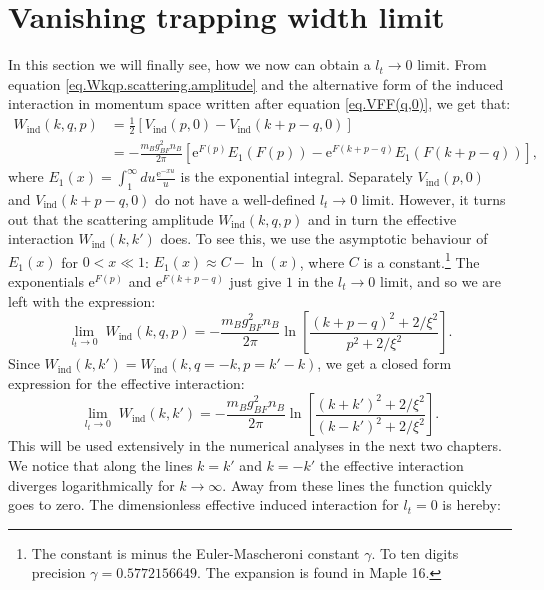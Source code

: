 \section{Vanishing trapping width limit} \label{sec.Vanishingtrappingwidtlimit}
In this section we will finally see, how we now can obtain a $l_t\to 0$ limit. From equation \eqref{eq.Wkqp.scattering.amplitude} and the alternative form of the induced interaction in momentum space written after equation \eqref{eq.VFF(q,0)}, we get that:
\begin{align}
W_{\text{ind}}(k, q, p) &= \frac{1}{2}\left[V_\text{ind}(p, 0) - V_\text{ind}(k + p - q,0)\right] \nonumber \\
&= -\frac{m_Bg_{BF}^2n_B}{2\pi}\left[ \text{e}^{F(p)} E_1(F(p)) - \text{e}^{F(k + p - q)} E_1(F(k + p - q)) \right], \nonumber
\end{align}
where $E_1(x) = \int_1^\infty du \frac{\text{e}^{-xu}}{u}$ is the exponential integral. Separately $V_\text{ind}(p,0)$ and $V_\text{ind}(k + p - q,0)$ do not have a well-defined $l_t \to 0$ limit. However, it turns out that the scattering amplitude $W_{\text{ind}}(k, q, p)$ and in turn the effective interaction $W_{\text{ind}}(k,k')$ does. To see this, we use the asymptotic behaviour of $E_1(x)$ for $0 < x \ll 1$: $E_1(x) \approx C -\ln(x)$, where $C$ is a constant.\footnote{The constant is minus the Euler-Mascheroni constant $\gamma$. To ten digits precision $\gamma = 0.5772156649$. The expansion is found in Maple 16.} The exponentials $\text{e}^{F(p)}$ and $\text{e}^{F(k + p - q)}$ just give $1$ in the $l_t \to 0$ limit, and so we are left with the expression:
\begin{equation}
\lim_{l_t \to 0} \; W_{\text{ind}}(k, q, p) = -\frac{m_Bg_{BF}^2n_B}{2\pi} \ln\left[\frac{(k + p - q)^2+2/\xi^2}{p^2+2/\xi^2}\right].
\label{eq.Wkqp.scattering.amplitude.lt=0} 
\end{equation}
Since $W_{\text{ind}}(k, k') = W_{\text{ind}}(k, q = -k, p = k' - k) $, we get a closed form expression for the effective interaction:
\begin{equation}
\lim_{l_t \to 0} \; W_{\text{ind}}(k, k') = -\frac{m_Bg_{BF}^2n_B}{2\pi} \ln\left[\frac{(k + k')^2+2/\xi^2}{(k - k')^2+2/\xi^2}\right].
\label{eq.EffectiveInteractionlt=0} 
\end{equation}
This will be used extensively in the numerical analyses in the next two chapters. We notice that along the lines $k = k'$ and $k = -k'$ the effective interaction diverges logarithmically for $k\to \infty$. Away from these lines the function quickly goes to zero. The dimensionless effective induced interaction for $l_t = 0$ is hereby:
